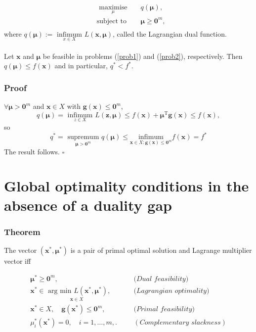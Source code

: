 \documentclass[12pt, a4paper]{article}
\begin{document}
\begin{equation}
\label{prob2}
\begin{aligned}
& \underset{\mu}{\text{ maximise }}
& & q(\boldsymbol{\mu}), \\
& \text{subject to}
& & \boldsymbol{\mu}\geq \bm{0}^m, \\
\end{aligned}
\end{equation}
where $q(\boldsymbol{\mu}) := \underset{x\in X}{\text{ infimum }} L(\bm{x},\boldsymbol{\mu})$, called the Lagrangian dual function.
\\\\
Let $\bm{x}$ and $\boldsymbol{\mu}$ be feasible in problems (\ref{prob1}) and (\ref{prob2}), respectively. Then $q(\boldsymbol{\mu})\leq f(\bm{x})$ and in particular, $q^*<f^*$.
\subsubsection*{Proof}
$\forall \boldsymbol{\mu} > \bm{0}^m$ and $\bm{x}\in X$ with $\bm{g}(\bm{x})\leq \bm{0}^m$, 
\begin{equation*}
q(\boldsymbol{\mu}) = \underset{z\in X}{\text{ infimum }} L(\bm{z}, \boldsymbol{\mu}) \leq f(\bm{x}) + \boldsymbol{\mu}^{\text{T}} \bm{g}(\bm{x}) \leq f(\bm{x}),
\end{equation*}
so
\begin{equation*}
q^* = \underset{\boldsymbol{\mu}>\bm{0}^m}{\text{ supremum }} q(\boldsymbol{\mu}) \leq \underset{\bm{x}\in X:\bm{g}(\bm{x})\leq \bm{0}^m}{ \text{infimum} } f(\bm{x}) = f^*
\end{equation*}
The result follows. $\square$

\section{Global optimality conditions in the absence of a duality gap}
\subsubsection*{Theorem}
The vector $(\bm{x}^*, \boldsymbol{\mu}^*)$ is a pair of primal optimal solution and Lagrange multiplier vector iff


\begin{equation}
\label{gloopt}
\begin{aligned}
 \boldsymbol{\mu}^* \geq \bm{0}^m,&
& & \textit{(Dual feasibility)}\\
 \bm{x}^* \in \underset{\bm{x}\in X}{\text{ arg min } L(\bm{x}^*, \boldsymbol{\mu}^*)},&
& & \textit{(Lagrangian optimality)}\\
 \bm{x}^*\in X, \quad \bm{g}(\bm{x}^*)\leq \bm{0}^m,&
& & \textit{(Primal feasibility)} \\
\mu_i^*(\bm{x}^*)=0, \quad i= 1,\dots,m,.&
& & (\textit{Complementary slackness})
\end{aligned}
\end{equation}
\end{document}
